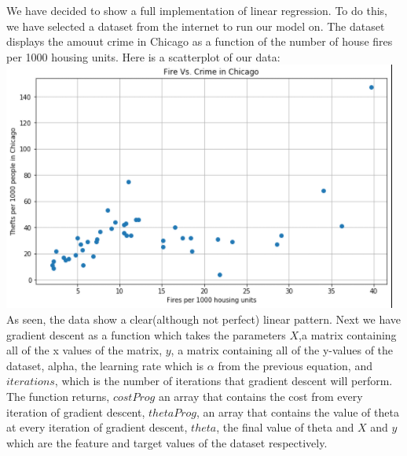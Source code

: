 \documentclass{article}
\begin{document}
We have decided to show a full implementation of linear regression. To do this, we have selected a dataset from the internet to run our model on. The dataset displays the amouut crime in Chicago as a function of the number of house fires per 1000 housing units. Here is a scatterplot of our data: \newline\smallskip
\includegraphics[scale = .85]{CrimeVsHouseFiresPNG.png}\\
As seen, the data show a clear(although not perfect) linear pattern. Next we have gradient descent as a function which takes the parameters $X$,a matrix containing all of the x values of the matrix, $y$, a matrix containing all of the y-values of the dataset, alpha, the learning rate which is $\alpha$ from the previous equation, and $iterations$, which is the number of iterations that gradient descent will perform. The function returns, $costProg$ an array that contains the cost from every iteration of gradient descent, $thetaProg$, an array that contains the value of theta at every iteration of gradient descent, $theta$, the final value of theta and $X$ and $y$ which are the feature and target values of the dataset respectively.\\
\end{document}
